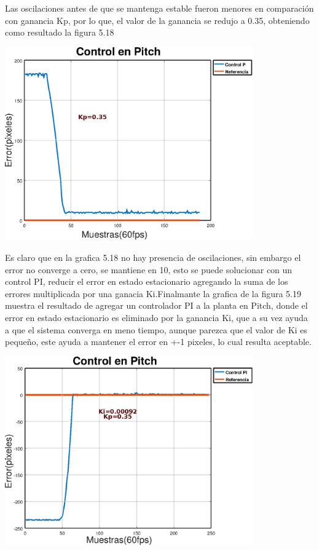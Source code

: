 Las oscilaciones antes de que se mantenga estable fueron menores en comparación con ganancia Kp, por lo que, el valor de la ganancia se 
redujo a 0.35, obteniendo como resultado la figura 5.18 
\begin{center}
	\includegraphics[width=0.8\textwidth]{Contenido/Cuerpo/Capitulo5/Fig27.eps}
	\label{Fig4}
\end{center}
Es claro que en la grafica 5.18 no hay presencia de oscilaciones, sin embargo el error no converge a cero, se mantiene en 10, esto se 
puede solucionar con un control PI, reducir el error en estado estacionario agregando la suma de los errores multiplicada por una ganacia 
Ki.Finalmante la grafica de la figura 5.19 muestra el resultado de agregar un controlador PI a la planta en Pitch, donde el error en estado 
estacionario es eliminado por la ganancia Ki, que a su vez ayuda a que el sistema converga en meno tiempo, aunque parezca que el valor de 
Ki es pequeño, este ayuda a mantener el error en +-1 pixeles, lo cual resulta aceptable.
\begin{center}
	\includegraphics[width=0.8\textwidth]{Contenido/Cuerpo/Capitulo5/Fig28.eps}
	\label{Fig4}
\end{center}

